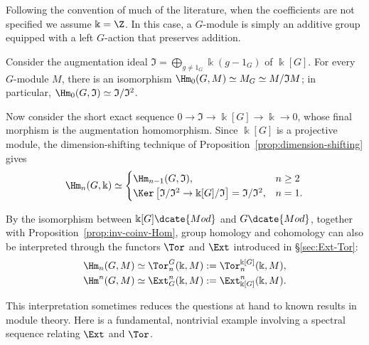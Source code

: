 Following the convention of much of the literature, when the coefficients are
not specified we assume $\Bbbk=\Z$. In this case, a $G$-module is simply an
additive group equipped with a left $G$-action that preserves addition.

\begin{example}\label{eg:group-H1}
	Consider the augmentation ideal
	$\mathfrak{I}=\bigoplus_{g\neq1_G}\Bbbk(g-1_G)$ of $\Bbbk[G]$. For every
	$G$-module $M$, there is an isomorphism
	$\Hm_0(G,M)\simeq M_G\simeq M/\mathfrak{I}M$; in particular,
	$\Hm_0(G,\mathfrak{I})\simeq\mathfrak{I}/\mathfrak{I}^2$.

	Now consider the short exact sequence
	$0\to\mathfrak{I}\to\Bbbk[G]\to\Bbbk\to0$, whose final morphism is the
	augmentation homomorphism. Since $\Bbbk[G]$ is a projective module, the
	dimension-shifting technique of Proposition~\ref{prop:dimension-shifting}
	gives
	\[ \Hm_n(G, \Bbbk) \simeq \begin{cases}
		\Hm_{n-1}(G, \mathfrak{I}), & n \geq 2 \\
		\Ker\left[ \mathfrak{I}/\mathfrak{I}^2 \to \Bbbk[G]/\mathfrak{I} \right] = \mathfrak{I}/\mathfrak{I}^2 , & n = 1.
	\end{cases}\]
\end{example}

By the isomorphism between $\Bbbk[G]\dcate{Mod}$ and $G\dcate{Mod}$, together
with Proposition~\ref{prop:inv-coinv-Hom}, group homology and cohomology can
also be interpreted through the functors $\Tor$ and $\Ext$ introduced in
\S\ref{sec:Ext-Tor}:
\begin{equation}\label{eqn:grp-Hm-Tor-Ext}\begin{aligned}
	\Hm_n(G, M) & \simeq \Tor^G_n(\Bbbk, M) := \Tor^{\Bbbk[G]}_n(\Bbbk, M), \\
	\Hm^n(G, M) & \simeq \Ext_G^n(\Bbbk, M) := \Ext_{\Bbbk[G]}^n(\Bbbk, M).
\end{aligned}\end{equation}

This interpretation sometimes reduces the questions at hand to known results
in module theory. Here is a fundamental, nontrivial example involving a
spectral sequence relating $\Ext$ and $\Tor$.

